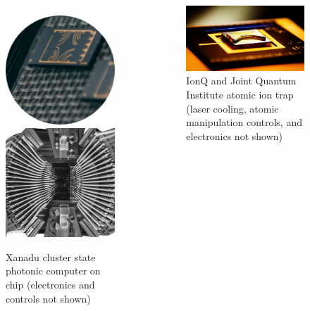 \documentclass[handout]{beamer}
\begin{document}
\begin{frame}
\begin{columns}
    \begin{figure}
      \centering
      \caption{Xanadu cluster state photonic computer on chip (electronics
        and controls not shown)~\cite{Xanadu-Hardware}}
      \includegraphics[width=0.48\linewidth]{Graphics/xanadu-chips-circle.png}    
      \includegraphics[width=0.48\linewidth]{Graphics/xanadu-control-systems.jpg}
    \end{figure}    %
    \begin{figure}
      \centering
      \includegraphics[width=0.95\linewidth]{Graphics/surface_trap-monroe-gallery.jpg}
      \caption{IonQ and Joint Quantum Institute atomic ion trap (laser
        cooling, atomic manipulation controls, and electronics not
        shown)~\cite{JQI-15M-NSF-news}}
    \end{figure}
  \end{columns}
\end{frame}
\end{document}
